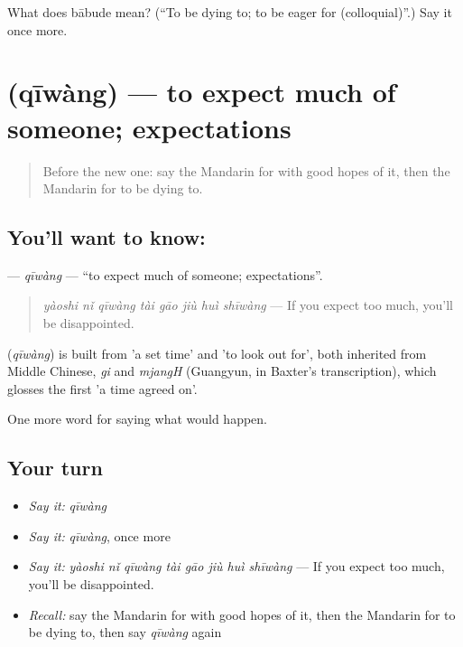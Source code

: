 \begin{tcolorbox}[breakable,colback=teal!4,colframe=teal!35!black,title={Before you move on}]
What does bābude mean? (\textquotedblleft{}To be dying to; to be eager for (colloquial)\textquotedblright{}.) Say it once more.
\end{tcolorbox}
\section[\texorpdfstring{\zh{期望} (qīwàng)}{期望 (qīwàng)}]{ (qīwàng) — to expect much of someone; expectations}

\label{lesson:ZH-C532-qiwang}



\begin{quote}
Before the new one: say the Mandarin for with good hopes of it, then the Mandarin for to be dying to.
\end{quote}

\subsection*{You'll want to know: }
\textbf{} — \emph{qīwàng} — \textquotedblleft{}to expect much of someone; expectations\textquotedblright{}.

\begin{quote}
\emph{yàoshi nǐ qīwàng tài gāo jiù huì shīwàng} — If you expect too much, you'll be disappointed.
\end{quote}

\begin{cousinweb}
\textbf{} (\emph{qīwàng}) is built from  'a set time' and  'to look out for', both inherited from Middle Chinese, \emph{gi} and \emph{mjangH} (Guangyun, in Baxter's transcription), which glosses the first 'a time agreed on'.
\end{cousinweb}

\begin{grammarlens}[title={What you've built}]
One more word for saying what would happen.
\end{grammarlens}

\subsection*{Your turn}
\begin{itemize}
\raggedright
  \item \emph{Say it:} \emph{qīwàng}
  \item \emph{Say it:} \emph{qīwàng}, once more
  \item \emph{Say it:} \emph{yàoshi nǐ qīwàng tài gāo jiù huì shīwàng} — If you expect too much, you'll be disappointed.
  \item \emph{Recall:} say the Mandarin for with good hopes of it, then the Mandarin for to be dying to, then say \emph{qīwàng} again
\end{itemize}

